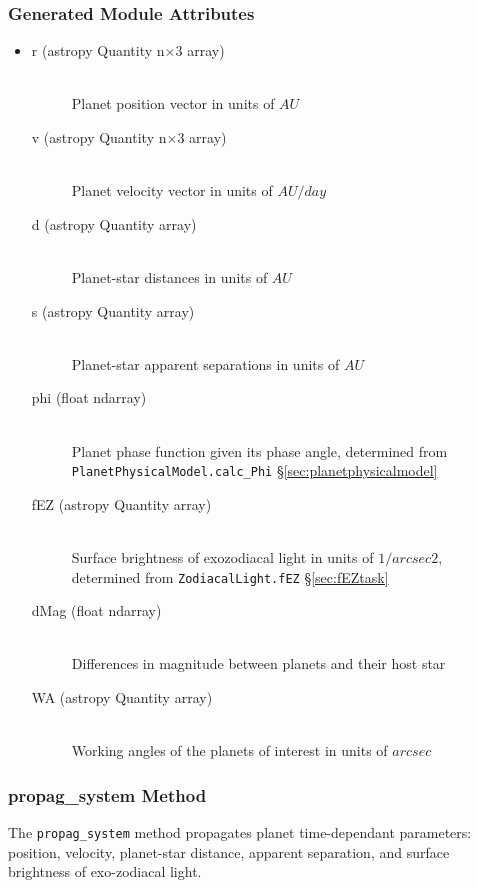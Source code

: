 \documentclass[cleanfoot]{asme2ej}
\begin{document}
\subsubsection*{Generated Module Attributes}
\begin{itemize}
\item 
\begin{description}
    \item[r (astropy Quantity n$\times$3 array)] \hfill \\ Planet position vector in units of $ AU $
    \item[v (astropy Quantity n$\times$3 array)] \hfill \\ Planet velocity vector in units of $ AU/day $
    \item[d (astropy Quantity array)] \hfill \\ Planet-star distances in units of $ AU $
    \item[s (astropy Quantity array)] \hfill \\ Planet-star apparent separations in units of $ AU $
    \item[phi (float ndarray)] \hfill \\ Planet phase function given its phase angle, determined from \verb+PlanetPhysicalModel.calc_Phi+ \S\ref{sec:planetphysicalmodel}
    \item[fEZ (astropy Quantity array)] \hfill \\ Surface brightness of exozodiacal light in units of $ 1/arcsec2 $, determined from \verb+ZodiacalLight.fEZ+ \S\ref{sec:fEZtask}
    \item[dMag (float ndarray)] \hfill \\ Differences in magnitude between planets and their host star
    \item[WA (astropy Quantity array)] \hfill \\ Working angles of the planets of interest in units of $arcsec$
\end{description}
\end{itemize}

\subsubsection{propag\_system Method} \label{sec:propagsystemtask}
The \verb+propag_system+ method propagates planet time-dependant parameters: position, velocity, planet-star distance, apparent separation, and surface brightness of exo-zodiacal light.
\end{document}
